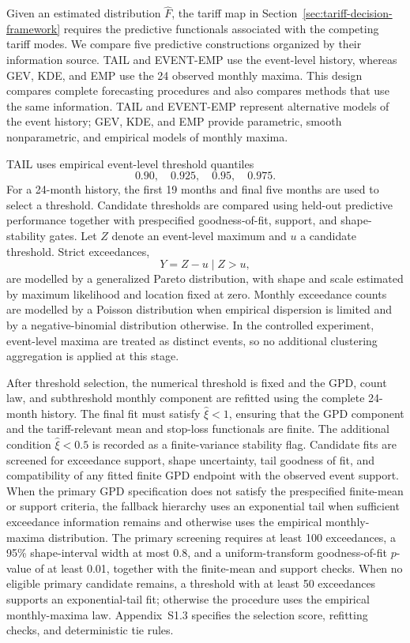 \documentclass[Times1COL]{WileyNJDv5}
\begin{document}
Given an estimated distribution $\widehat F$, the tariff map in
Section~\ref{sec:tariff-decision-framework} requires the predictive
functionals associated with the competing tariff modes. We compare five
predictive constructions organized by their information source. TAIL
and EVENT-EMP use the event-level history, whereas GEV, KDE, and EMP
use the 24 observed monthly maxima. This design compares complete forecasting procedures and also
compares methods that use the same information. TAIL and EVENT-EMP
represent alternative models of the event history; GEV, KDE, and EMP
provide parametric, smooth nonparametric, and empirical models of
monthly maxima.

TAIL uses empirical event-level threshold quantiles
\[
0.90,\quad 0.925,\quad 0.95,\quad 0.975.
\]
For a 24-month history, the first 19 months and final five months are
used to select a threshold. Candidate thresholds are compared using
held-out predictive performance together with prespecified goodness-of-fit,
support, and shape-stability gates. Let $Z$ denote an event-level maximum
and $u$ a candidate threshold. Strict exceedances,
\[
Y=Z-u\mid Z>u,
\]
are modelled by a generalized Pareto distribution, with shape and scale
estimated by maximum likelihood and location fixed at zero. Monthly
exceedance counts are modelled by a Poisson distribution when empirical
dispersion is limited and by a negative-binomial distribution otherwise.
In the controlled experiment, event-level maxima are treated as distinct
events, so no additional clustering aggregation is applied at this stage.

After threshold selection, the numerical threshold is fixed and the GPD,
count law, and subthreshold monthly component are refitted using the
complete 24-month history. The final fit must satisfy $\widehat\xi<1$,
ensuring that the GPD component and the tariff-relevant mean and stop-loss
functionals are finite. The additional condition $\widehat\xi<0.5$ is
recorded as a finite-variance stability flag. Candidate fits are screened
for exceedance support, shape uncertainty, tail goodness of fit, and
compatibility of any fitted finite GPD endpoint with the observed event
support. When the primary GPD specification does not satisfy the
prespecified finite-mean or support criteria, the fallback hierarchy uses
an exponential tail when sufficient exceedance information remains and
otherwise uses the empirical monthly-maxima distribution. The primary
screening requires at least 100 exceedances, a 95\% shape-interval width at
most 0.8, and a uniform-transform goodness-of-fit $p$-value of at least
0.01, together with the finite-mean and support checks. When no eligible
primary candidate remains, a threshold with at least 50 exceedances
supports an exponential-tail fit; otherwise the procedure uses the
empirical monthly-maxima law. Appendix~S1.3 specifies the selection score,
refitting checks, and deterministic tie rules.
\end{document}
